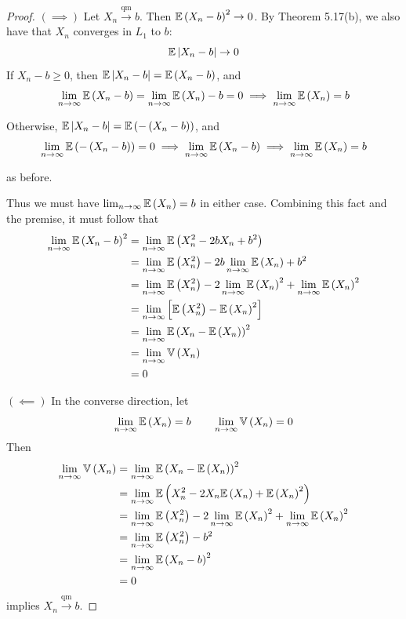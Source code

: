 \documentclass[a4paper]{article}
\begin{document}
\begin{proof}[Proof] 
\(\left( \implies \right)\)  Let \(X_{n} \xrightarrow{\text{qm}} b\). Then \(\mathbb{E}\left( X_{n} - b \right)^{2} \rightarrow 0\). By Theorem 5.17(b), we also have that \(X_{n}\) converges in \(L_{1}\) to \(b\):
\[
	\mathbb{E}\left| X_{n} - b \right| \rightarrow 0
\]
If \(X_{n} - b \ge 0\), then \(\mathbb{E}\left|X_{n} - b \right| = \mathbb{E}\left( X_{n} - b \right)\), and 
\[
	\lim_{n \to \infty} \mathbb{E}\left( X_{n} - b \right) = \lim_{n \to \infty} \mathbb{E}\left( X_{n} \right) - b = 0 \implies \lim_{n \to \infty} \mathbb{E}\left( X_{n} \right) = b
\]

Otherwise, \(\mathbb{E}\left| X_{n} - b \right| = \mathbb{E}\left( -\left( X_{n} - b \right)  \right)\), and 
\[
	\lim_{n \to \infty} \mathbb{E}\left( - \left( X_{n} - b \right)  \right) = 0 \implies \lim_{n \to \infty} \mathbb{E}\left( X_{n} - b \right) \implies \lim_{n \to \infty} \mathbb{E}\left( X_{n} \right) = b
\] 

as before.

Thus we must have \(\lim_{n \to \infty}  \mathbb{E}\left( X_{n} \right) = b\) in either case. Combining this fact and the premise, it must follow that
\begin{align*}
	\lim_{n \to \infty} \mathbb{E}\left( X_{n} - b \right)^{2} & = \lim_{n \to \infty} \mathbb{E}\left( X^{2}_{n} - 2bX_{n} + b^{2} \right) \\
	& = \lim_{n \to \infty} \mathbb{E}\left( X^{2}_{n} \right) - 2b \lim_{n \to \infty} \mathbb{E}\left( X_{n} \right) + b^{2} \\
	& = \lim_{n \to \infty} \mathbb{E}\left( X^{2}_{n} \right) - 2 \lim_{n \to \infty} \mathbb{E}\left( X_{n} \right)^{2} + \lim_{n \to \infty} \mathbb{E}\left( X_{n} \right)^{2} \\
	& = \lim_{n \to \infty} \left[ \mathbb{E}\left( X^{2}_{n} \right) - \mathbb{E}\left( X_{n} \right)^{2} \right] \\
	& = \lim_{n \to \infty} \mathbb{E}\left( X_{n} - \mathbb{E}\left( X_{n} \right) \right)^{2} \\
	& = \lim_{n \to \infty} \mathbb{V}\left( X_{n} \right) \\
	& = 0
\end{align*}

\(\left( \impliedby \right) \) In the converse direction, let
\[
	\lim_{n \to \infty} \mathbb{E}\left( X_{n} \right) = b \qquad \lim_{n \to \infty} \mathbb{V}\left( X_{n} \right) = 0
\]
Then 
\begin{align*}
	\lim_{n \to \infty} \mathbb{V}\left( X_{n} \right) & = \lim_{n \to \infty} \mathbb{E}\left( X_{n} - \mathbb{E}\left( X_{n} \right) \right)^{2}  \\
	& = \lim_{n \to \infty} \mathbb{E}\left( X^{2}_{n} - 2 X_{n} \mathbb{E}\left( X_{n} \right) + \mathbb{E}\left( X_{n} \right)^{2} \right) \\
	& = \lim_{n \to \infty} \mathbb{E}\left( X^{2}_{n} \right) - 2 \lim_{n \to \infty} \mathbb{E}\left( X_{n} \right)^{2} + \lim_{n \to \infty} \mathbb{E}\left( X_{n} \right)^{2} \\
	& = \lim_{n \to \infty} \mathbb{E}\left( X^{2}_{n} \right) - b^{2} \\
	& = \lim_{n \to \infty} \mathbb{E}\left( X_{n} - b \right)^{2} \\
	& = 0
\end{align*}
implies \(X_{n} \xrightarrow{\text{qm}} b\).
\end{proof}
\end{document}
